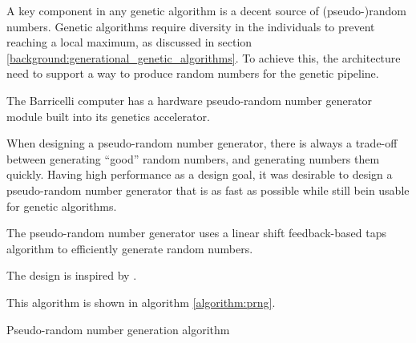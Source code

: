 A key component in any genetic algorithm is a decent source of (pseudo-)random numbers.
Genetic algorithms require diversity in the individuals to prevent reaching a local maximum, as discussed in section \ref{background:generational_genetic_algorithms}. 
To achieve this, the architecture need to support a way to produce random numbers for the genetic pipeline.   

The Barricelli computer has a hardware pseudo-random number generator module built into its genetics accelerator.

When designing a pseudo-random number generator, there is always a trade-off between generating ``good'' random numbers, and generating numbers them quickly.
Having high performance as a design goal\cn, it was desirable to design a pseudo-random number generator that is as fast as possible while still bein usable for genetic algorithms.

The pseudo-random number generator uses a linear shift feedback-based taps algorithm to efficiently generate random numbers.

The design is inspired by .

This algorithm is shown in algorithm \vref{algorithm:prng}.

\begin{algorithm}[H]
\SetAlgoLined
\DontPrintSemicolon
{}
\caption{Pseudo-random number generation algorithm}
\label{algorithm:prng}
\end{algorithm}

